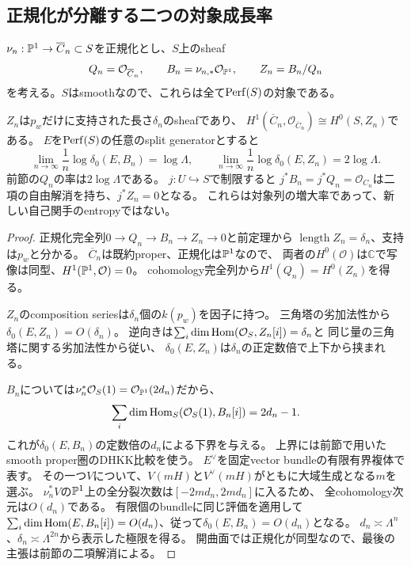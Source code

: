 \subsection{正規化が分離する二つの対象成長率}
$\nu_n:\mathbb P^1\to\overline C_n\subset S$を正規化とし、$S$上のsheaf
\[
 Q_n=\mathcal O_{\overline C_n},\qquad
 B_n=\nu_{n,*}\mathcal O_{\mathbb P^1},\qquad
 Z_n=B_n/Q_n
\]
を考える。$S$はsmoothなので、これらは全て$\operatorname{Perf}(S)$の対象である。

\begin{theorem}[一つの境界点が持つ正規化欠損の成長]
\label{thm:normalization-defect-growth}
$Z_n$は$p_w$だけに支持された長さ$\delta_n$のsheafであり、
$H^1(\overline C_n,\mathcal O_{\overline C_n})\cong H^0(S,Z_n)$である。
$E$を$\operatorname{Perf}(S)$の任意のsplit generatorとすると
\begin{equation}\label{eq:normalization-complexity-rates}
 \lim_{n\to\infty}\frac1n\log\delta_0(E,B_n)=\log\Lambda,
 \qquad
 \lim_{n\to\infty}\frac1n\log\delta_0(E,Z_n)=2\log\Lambda.
\end{equation}
前節の$Q_n$の率は$2\log\Lambda$である。
$j:U\hookrightarrow S$で制限すると
$j^*B_n=j^*Q_n=\mathcal O_{C_n}$は二項の自由解消を持ち、$j^*Z_n=0$となる。
これらは対象列の増大率であって、新しい自己関手のentropyではない。
\end{theorem}
\begin{proof}
正規化完全列$0\to Q_n\to B_n\to Z_n\to0$と前定理から
$\operatorname{length}Z_n=\delta_n$、支持は$p_w$と分かる。
$\overline C_n$は既約proper、正規化は$\mathbb P^1$なので、
両者の$H^0(\mathcal O)$は$\mathbb C$で写像は同型、$H^1(\mathbb P^1,\mathcal O)=0$。
cohomology完全列から$H^1(Q_n)=H^0(Z_n)$を得る。

$Z_n$のcomposition seriesは$\delta_n$個の$k(p_w)$を因子に持つ。
三角塔の劣加法性から$\delta_0(E,Z_n)=O(\delta_n)$。
逆向きは$\sum_i\dim\operatorname{Hom}(\mathcal O_S,Z_n[i])=\delta_n$と
同じ量の三角塔に関する劣加法性から従い、
$\delta_0(E,Z_n)$は$\delta_n$の正定数倍で上下から挟まれる。

$B_n$については$\nu_n^*\mathcal O_S(1)=\mathcal O_{\mathbb P^1}(2d_n)$だから、
\[
 \sum_i\dim\operatorname{Hom}_S(\mathcal O_S(1),B_n[i])=2d_n-1.
\]
これが$\delta_0(E,B_n)$の定数倍の$d_n$による下界を与える。
上界には前節で用いたsmooth proper圏のDHKK比較を使う。
$E^\vee$を固定vector bundleの有限有界複体で表す。
その一つ$V$について、$V(mH)$と$V^\vee(mH)$がともに大域生成となる$m$を選ぶ。
$\nu_n^*V$の$\mathbb P^1$上の全分裂次数は$[-2md_n,2md_n]$に入るため、
全cohomology次元は$O(d_n)$である。
有限個のbundleに同じ評価を適用して
$\sum_i\dim\operatorname{Hom}(E,B_n[i])=O(d_n)$、従って$\delta_0(E,B_n)=O(d_n)$となる。
$d_n\asymp\Lambda^n$、$\delta_n\asymp\Lambda^{2n}$から表示した極限を得る。
開曲面では正規化が同型なので、最後の主張は前節の二項解消による。
\end{proof}

